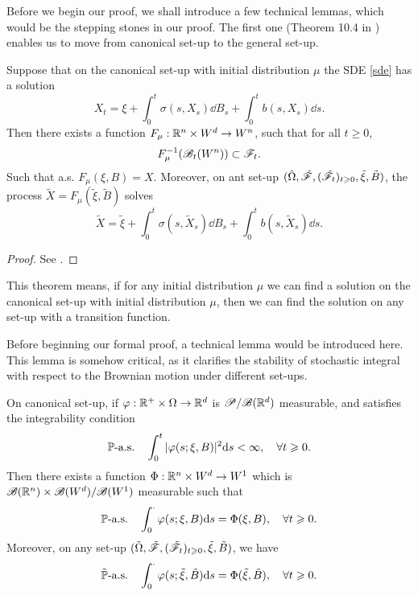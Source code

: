 \documentclass[8pt,onesided]{article}
\begin{document}
Before we begin our proof, we shall introduce a few technical lemmas, which would be the stepping stones in our proof. The first one (Theorem 10.4 in \cite{rogers2000diffusions2}) enables us to move from canonical set-up to the general set-up. 

\begin{theorem}
    \label{trans}
Suppose that on the canonical set-up with initial distribution $\mu$ the SDE \ref{sde} has a solution
\begin{equation*}
    X_t=\xi +\int_0^t\sigma(s,X_s) \dd B_s +\int_0^t b(s,X_s) \dd s.
\end{equation*}
Then there exists a function $F_{\mu}: \mathbb{R}^{n}\times W^d \to W^n$, such that for all $t\ge 0$, 
\begin{equation*}
    F_{\mu}^{-1}(\mathscr{B}_t(W^n))\subset \mathscr{F}_t.
\end{equation*}
Such that a.s. $F_{\mu}(\xi,B)=X$. Moreover, on ant set-up $(\tilde{\Omega}, \tilde {\mathscr{F}}, (\tilde {\mathscr{F}}_t)_{t\geqslant 0}, \tilde{\xi}, \tilde{B})$, the process $\tilde{X}=F_{\mu} (\tilde{\xi},\tilde{B})$ solves
\begin{equation*}
    \tilde{X}=\tilde{\xi}+\int_0^t \sigma(s,\tilde X_s)\dd B_s+\int_0^t b(s,\tilde X_s) \dd s.
\end{equation*}
\end{theorem}
\begin{proof}
    See \cite[Theorem 10.4]{rogers2000diffusions2}.
\end{proof}

This theorem means, if for any initial distribution $\mu$ we can find a solution on the canonical set-up with initial distribution $\mu$, then we can find the solution on any set-up with a transition function. 

Before beginning our formal proof, a technical lemma would be introduced here. This lemma is somehow critical, as it clarifies the stability of stochastic integral with respect to the Brownian motion under different set-ups.

\begin{lemma}
\label{stab}
On canonical set-up, if $\varphi:\mathbb{R}^{+}\times \Omega\to \mathbb{R}^d$ is $\mathscr{P}/\mathscr{B}(\mathbb{R}^d)$ measurable, and satisfies the integrability condition
\begin{equation*}
    \mathbb{P}\text{-a.s.}\quad \int_0^t |\varphi(s;\xi,B)|^2 \dd s<\infty,\quad \forall t\geqslant 0.
\end{equation*}
Then there exists a function $\Phi:\mathbb{R}^n\times W^d\to W^1$ which is $\mathscr{B}(\mathbb{R}^n)\times\mathscr{B}(W^d)/\mathscr{B}(W^1)$ measurable such that
\begin{equation*}
    \mathbb{P}\text{-a.s.}\quad \int_0^{\cdot} \varphi(s;\xi,B) \dd s=\Phi(\xi,B),\quad \forall t\geqslant 0.
\end{equation*}
Moreover, on any set-up $(\tilde{\Omega},\tilde{ \mathscr{F}},(\tilde{\mathscr{F}}_t)_{t\geqslant0}, \tilde{\xi},\tilde{B})$, we have
\begin{equation*}
    \tilde {\mathbb{P}}\text{-a.s.}\quad \int_0^{\cdot} \varphi(s;\tilde \xi,\tilde B) \dd s=\Phi(\tilde \xi,\tilde B),\quad \forall t\geqslant 0.
\end{equation*}
\end{lemma}
\end{document}
